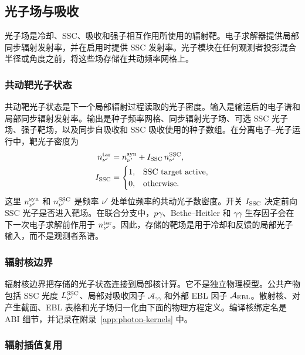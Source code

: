 \documentclass[twocolumn]{aastex702}
\begin{document}
\subsection{光子场与吸收} \label{sec:photon}

光子场是冷却、SSC、吸收和强子相互作用所使用的辐射靶。电子求解器提供局部同步辐射发射率，并在启用时提供 SSC 发射率。光子模块在任何观测者投影混合半径或角度之前，将这些场存储在共动频率网格上。

\subsubsection{共动靶光子状态}

共动靶光子状态是下一个局部辐射过程读取的光子密度。输入是输运后的电子谱和局部同步辐射发射率。输出是种子频率网格、同步辐射光子场、可选 SSC 光子场、强子靶场，以及同步自吸收和 SSC 吸收使用的种子数组。在分离电子--光子运行中，靶光子密度为
\begin{equation}
\begin{aligned}
n_{\nu'}^{\rm tar}
&=n_{\nu'}^{\rm syn}
+I_{\rm SSC}\,n_{\nu'}^{\rm SSC},\\
I_{\rm SSC}
&=
\begin{cases}
1, & \text{SSC target active},\\
0, & \text{otherwise}.
\end{cases}
\end{aligned}
\end{equation}
这里 \(n_{\nu'}^{\rm syn}\) 和 \(n_{\nu'}^{\rm SSC}\) 是频率 \(\nu'\) 处单位频率的共动光子数密度。开关 \(I_{\rm SSC}\) 决定前向 SSC 光子是否进入靶场。在联合分支中，\(p\gamma\)、Bethe--Heitler 和 \(\gamma\gamma\) 生存因子会在下一次电子求解前作用于 \(n_{\nu'}^{\rm tar}\)。因此，存储的靶场是用于冷却和反馈的局部光子输入，而不是观测者系谱。

\subsubsection{辐射核边界}

辐射核边界把存储的光子状态连接到局部核计算。它不是独立物理模型。公共产物包括 SSC 光度 \(L_{\nu'}^{\rm SSC}\)、局部对吸收因子 \(\mathcal{A}_{\gamma\gamma}\) 和外部 EBL 因子 \(\mathcal{A}_{\rm EBL}\)。散射核、对产生截面、EBL 表格和光子场归一化由下面的物理方程定义。编译核绑定名是 ABI 细节，并记录在附录~\ref{app:photon-kernels} 中。

\subsubsection{辐射插值复用}
\end{document}
